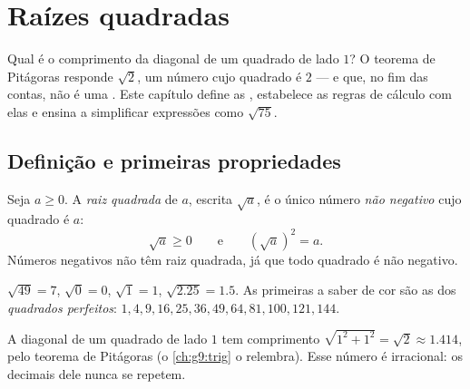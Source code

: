 \chapter{Raízes quadradas}\label{ch:g9:sqrt}

Qual é o comprimento da diagonal de um quadrado de lado $1$? O teorema
de Pitágoras responde $\sqrt 2$, um número cujo quadrado é $2$ --- e
que, no fim das contas, não é uma . Este capítulo define as
, estabelece as regras de cálculo com elas e ensina a
simplificar expressões como $\sqrt{75}$.

\section{Definição e primeiras propriedades}

\begin{definition}\label{def:g9:sqrt:def}
Seja $a \geq 0$. A \emph{raiz quadrada} de $a$,
escrita $\sqrt a$, é o único número \emph{não negativo} cujo quadrado é
$a$:
\[
\sqrt a \geq 0
\qquad\text{e}\qquad
\left(\sqrt a\right)^2 = a .
\]
Números negativos não têm raiz quadrada, já que todo quadrado é não
negativo.
\end{definition}

\begin{example}
$\sqrt{49} = 7$, $\sqrt 0 = 0$, $\sqrt 1 = 1$, $\sqrt{2.25} = 1.5$. As
primeiras  a saber de cor são as dos \emph{quadrados
perfeitos}: $1, 4, 9, 16, 25, 36, 49, 64, 81, 100, 121, 144$.
\end{example}

\begin{omfigure}

{\small A diagonal de um quadrado de lado $1$ tem comprimento
$\sqrt{1^2 + 1^2} = \sqrt2 \approx 1.414$, pelo teorema de Pitágoras (o
\cref{ch:g9:trig} o relembra). Esse número é irracional: os decimais
dele nunca se repetem.}
\end{omfigure}

